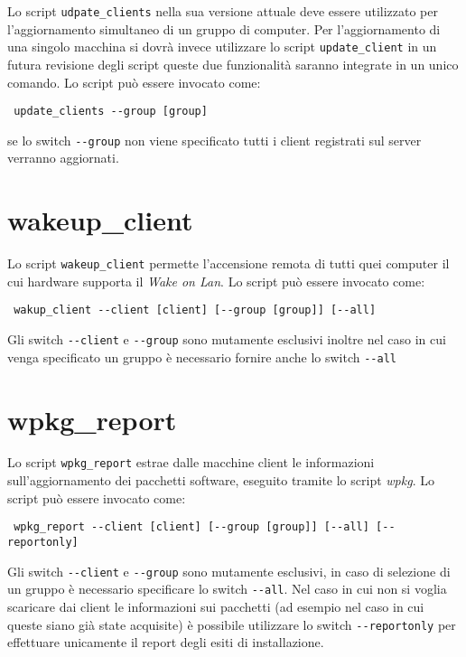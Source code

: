 \documentclass[a4paper,10pt,oneside]{memoir}
\begin{document}
Lo script \verb#udpate_clients# nella sua versione attuale deve essere utilizzato per l'aggiornamento simultaneo di un gruppo di computer. Per l'aggiornamento di una singolo macchina si dovrà invece utilizzare lo script \verb#update_client# in un futura revisione degli script queste due funzionalità saranno integrate in un unico comando. Lo script può essere invocato come:
\begin{verbatim}
 update_clients --group [group]
\end{verbatim}
se lo switch \verb#--group# non viene specificato tutti i client registrati sul server verranno aggiornati.

\section*{wakeup\_client}

Lo script \verb#wakeup_client# permette l'accensione remota di tutti quei computer il cui hardware supporta il \emph{Wake on Lan}. Lo script può essere invocato come:
\begin{verbatim}
 wakup_client --client [client] [--group [group]] [--all]
\end{verbatim}
Gli switch \verb#--client# e \verb#--group# sono mutamente esclusivi inoltre nel caso in cui venga specificato un gruppo è necessario fornire anche lo switch \verb#--all#

\section*{wpkg\_report}

Lo script \verb#wpkg_report# estrae dalle macchine client le informazioni sull'aggiornamento dei pacchetti software, eseguito tramite lo script \emph{wpkg}. Lo script può essere invocato come:
\begin{verbatim}
 wpkg_report --client [client] [--group [group]] [--all] [--reportonly]
\end{verbatim}
Gli switch \verb#--client# e \verb#--group# sono mutamente esclusivi, in caso di selezione di un gruppo è necessario specificare lo switch \verb#--all#. Nel caso in cui non si voglia scaricare dai client le informazioni sui pacchetti (ad esempio nel caso in cui queste siano già state acquisite) è possibile utilizzare lo switch \verb#--reportonly# per effettuare unicamente il report degli esiti di installazione.
\end{document}
